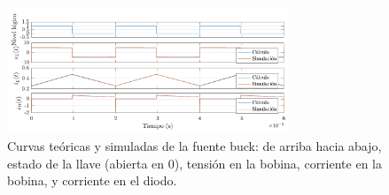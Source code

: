 \documentclass[e4_tp1_main.tex]{subfiles}
\begin{document}
\begin{figure}[ht]
	\centering
	\includegraphics[width=0.75\textwidth]{images/ej2/curvas.pdf}
	\caption{Curvas te\'oricas y simuladas de la fuente buck: de arriba hacia abajo, estado de la llave (abierta en 0), tensi\'on en la bobina, corriente en la bobina, y corriente en el diodo.}
	\label{fig:buck-curvas}
\end{figure}
\end{document}
